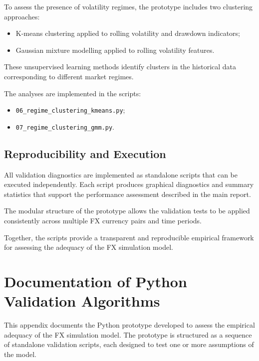 To assess the presence of volatility regimes, the prototype includes two clustering approaches:

\begin{itemize}
	
	\item K-means clustering applied to rolling volatility and drawdown indicators;
	\item Gaussian mixture modelling applied to rolling volatility features.
	
\end{itemize}

These unsupervised learning methods identify clusters in the historical data corresponding to different market regimes.

The analyses are implemented in the scripts:

\begin{itemize}
	
	\item \texttt{06\_regime\_clustering\_kmeans.py};
	\item \texttt{07\_regime\_clustering\_gmm.py}.
	
\end{itemize}

\subsection{Reproducibility and Execution}

All validation diagnostics are implemented as standalone scripts that can be executed independently. Each script produces graphical diagnostics and summary statistics that support the performance assessment described in the main report.

The modular structure of the prototype allows the validation tests to be applied consistently across multiple FX currency pairs and time periods.

Together, the scripts provide a transparent and reproducible empirical framework for assessing the adequacy of the FX simulation model.
	
	

 
	\section{Documentation of Python Validation Algorithms}
	
	This appendix documents the Python prototype developed to assess the empirical adequacy of the FX simulation model. The prototype is structured as a sequence of standalone validation scripts, each designed to test one or more assumptions of the model.
	
